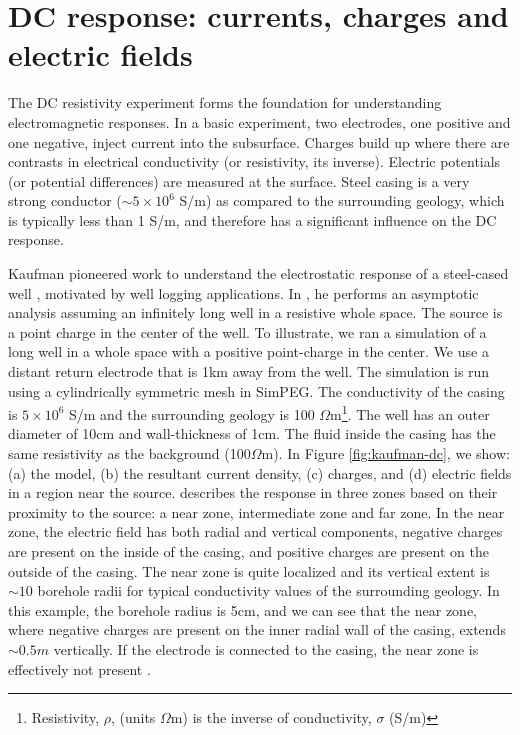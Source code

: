 \documentclass[
    paper
]{geophysics}
\begin{document}
\section{DC response: currents, charges and electric fields}

The DC resistivity experiment forms the foundation for understanding electromagnetic responses. In a basic experiment, two electrodes, one positive and one negative, inject current into the subsurface. Charges build up where there are contrasts in electrical conductivity (or resistivity, its inverse). Electric potentials (or potential differences) are measured at the surface. Steel casing is a very strong conductor ($\sim 5\times 10^6$ S/m) as compared to the surrounding geology, which is typically less than 1 S/m, and therefore has a significant influence on the DC response.

Kaufman pioneered work to understand the electrostatic response of a steel-cased well \cite{Kaufman1990, Kaufman1993}, motivated by well logging applications. In \cite{Kaufman1990}, he performs an asymptotic analysis assuming an infinitely long well in a resistive whole space. The source is a point charge in the center of the well. To illustrate, we ran a simulation of a long well in a whole space with a positive point-charge in the center. We use a distant return electrode that is 1km away from the well. The simulation is run using a cylindrically symmetric mesh in SimPEG. The conductivity of the casing is $5\times10^6$ S/m and the surrounding geology is 100 $\Omega$m\footnote{Resistivity, $\rho$, (units $\Omega$m) is the inverse of conductivity, $\sigma$ (S/m)}. The well has an outer diameter of 10cm and wall-thickness of 1cm. The fluid inside the casing has the same resistivity as the background (100$\Omega$m). In Figure \ref{fig:kaufman-dc}, we show: (a) the model, (b) the resultant current density, (c) charges, and (d) electric fields in a region near the source. \cite{Kaufman1990} describes the response in three zones based on their proximity to the source: a near zone, intermediate zone and far zone. In the near zone, the electric field has both radial and vertical components, negative charges are present on the inside of the casing, and positive charges are present on the outside of the casing. The near zone is quite localized and its vertical extent is $\sim10$ borehole radii for typical conductivity values of the surrounding geology. In this example, the borehole radius is 5cm, and we can see that the near zone, where negative charges are present on the inner radial wall of the casing, extends $\sim 0.5m$ vertically. If the electrode is connected to the casing, the near zone is effectively not present \citep{Kaufman1993}.
\end{document}
